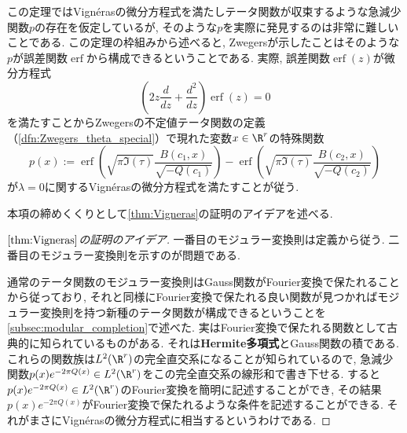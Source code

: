 \documentclass[11pt,b5paper,oneside,lualatex]{ltjsarticle} %
\DeclareMathOperator{\erf}{erf}
\numberwithin{equation}{section} %
\begin{document}
この定理ではVign\'{e}rasの微分方程式を満たしテータ関数が収束するような急減少関数$ p $の存在を仮定しているが, そのような$ p $を実際に発見するのは非常に難しいことである. 
この定理の枠組みから述べると, Zwegersが示したことはそのような$ p $が誤差関数$ \erf $から構成できるということである. 
実際, 誤差関数$ \erf(z) $が微分方程式
\[
\left( 2 z \frac{d}{dz} + \frac{d^2}{dz} \right) \erf(z) = 0
\]
を満たすことからZwegersの不定値テータ関数の定義（\cref{dfn:Zwegers_theta_special}）で現れた変数$ x \in \R^r $の特殊関数
\[
p(x) :=
\erf \left( \sqrt{\pi \Im(\tau)} \frac{B(c_1, x)}{\sqrt{-Q(c_1)}} \right) - \erf \left( \sqrt{\pi \Im(\tau)} \frac{B(c_2, x)}{\sqrt{-Q(c_2)}} \right)
\]
が$ \lambda = 0 $に関するVign\'{e}rasの微分方程式を満たすことが従う. 

本項の締めくくりとして\cref{thm:Vigneras}の証明のアイデアを述べる. 

\begin{proof}[$ \cref{thm:Vigneras} $の証明のアイデア]
	一番目のモジュラー変換則は定義から従う. 
	二番目のモジュラー変換則を示すのが問題である. 
	
	通常のテータ関数のモジュラー変換則はGauss関数がFourier変換で保たれることから従っており, それと同様にFourier変換で保たれる良い関数が見つかればモジュラー変換則を持つ新種のテータ関数が構成できるということを\cref{subsec:modular_completion}で述べた. 
	実はFourier変換で保たれる関数として古典的に知られているものがある. 
	それは\textbf{Hermite多項式}とGauss関数の積である. 
	これらの関数族は$ L^2(\R^r) $の完全直交系になることが知られているので, 急減少関数$ p(x) e^{-2\pi Q(x)} \in L^2(\R^r) $をこの完全直交系の線形和で書き下せる.
	すると$ p(x) e^{-2\pi Q(x)} \in L^2(\R^r) $のFourier変換を簡明に記述することができ, その結果$ p(x) e^{-2\pi Q(x)} $がFourier変換で保たれるような条件を記述することができる. 
	それがまさにVign\'{e}rasの微分方程式に相当するというわけである. 	
\end{proof}



\end{document}
